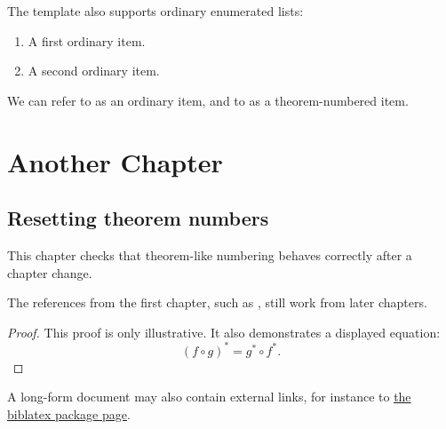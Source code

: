The template also supports ordinary enumerated lists:
\begin{enumerate}[label=(\alph*), ref=(\alph*)]
    \item A first ordinary item.
        \label{item:longform-ordinary-first} 
    \item A second ordinary item.
        \label{item:longform-ordinary-second} 
\end{enumerate}
We can refer to  as an ordinary item, and
to  as a theorem-numbered item.

\chapter{Another Chapter}

\section{Resetting theorem numbers}

This chapter checks that theorem-like numbering behaves correctly after a
chapter change.

\begin{lemma}
    \label{lemma:second-chapter}
    The references from the first chapter, such as
    , still work from later chapters.
\end{lemma}

\begin{proof}
    This proof is only illustrative. It also demonstrates a displayed equation:
    \begin{equation}
        \label{equation:pull-back}
        (f \circ g)^* = g^* \circ f^* .
    \end{equation}
\end{proof}


\begin{example}
    \label{example:external-link}
    A long-form document may also contain external links, for instance to
    \href{https://www.ctan.org/pkg/biblatex}{the biblatex package page}.
\end{example}


\printbibliography


